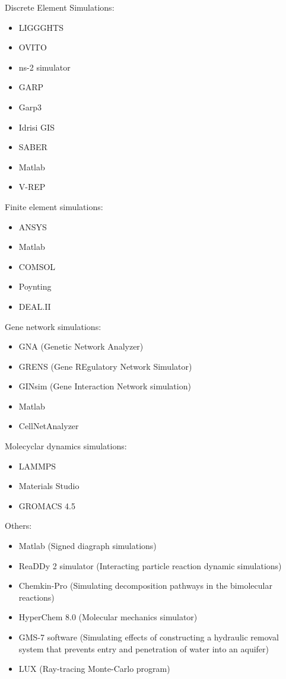\documentclass[utf8]{gradu3}
\begin{document}
Discrete Element Simulations:
\begin{itemize}
    \item LIGGGHTS 
    \item OVITO
    \item ns-2 simulator
    \item GARP
    \item Garp3
    \item Idrisi GIS
    \item SABER
    \item Matlab
    \item V-REP
\end{itemize}

Finite element simulations:
\begin{itemize}
    \item ANSYS
    \item Matlab
    \item COMSOL
    \item Poynting
    \item DEAL.II
\end{itemize}

Gene network simulations:
\begin{itemize}
    \item GNA (Genetic Network Analyzer) 
    \item GRENS (Gene REgulatory Network Simulator)
    \item GINsim (Gene Interaction Network simulation)
    \item Matlab
    \item CellNetAnalyzer
\end{itemize}


Molecyclar dynamics simulations:
\begin{itemize}
    \item LAMMPS
    \item Materials Studio
    \item GROMACS 4.5
\end{itemize}

Others:
\begin{itemize}
    \item Matlab (Signed diagraph simulations)
    \item ReaDDy 2 simulator (Interacting particle reaction dynamic simulations)
    \item Chemkin-Pro (Simulating decomposition pathways in the bimolecular reactions)
    \item HyperChem 8.0 (Molecular mechanics simulator)
    \item GMS-7 software (Simulating effects of constructing a hydraulic removal system that prevents entry and penetration of water into an aquifer)
    \item LUX (Ray-tracing Monte-Carlo program)
\end{itemize}
\end{document}
